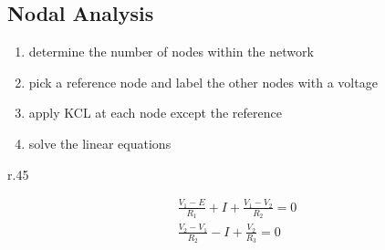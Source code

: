 
\subsection{Nodal Analysis} %
	
	\begin{enumerate}
		\item determine the number of nodes within the network
		\item pick a reference node and label the other nodes with a voltage
		\item apply KCL at each node except the reference
		\item solve the linear equations
	\end{enumerate}
	
	\begin{wrapfigure}[0]{r}{.45\columnwidth}
		\vspace{-1.2cm}
	\end{wrapfigure}
	
	\begin{gather*}
		\frac{V_1 - E}{R_1} + I + \frac{V_1-V_2}{R_2} = 0 \\
		\frac{V_2 - V_1}{R_2} - I + \frac{V_2}{R_3} = 0
	\end{gather*}
	
	\hspace{2pt}
